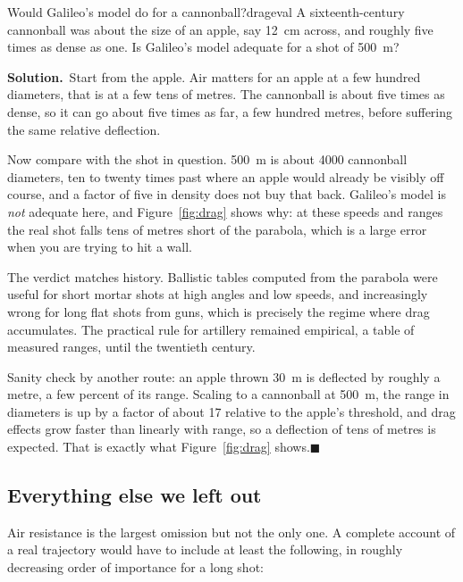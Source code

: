 \documentclass[11pt,twoside,openany]{book}
\newcounter{check}[chapter]
\newcommand{\solution}{\par\smallskip\noindent\textbf{Solution.}\ }
\newcommand{\qed}{\hfill$\blacksquare$}
\begin{document}
\begin{example}{Would Galileo's model do for a cannonball?}{drageval}
A sixteenth-century cannonball was about the size of an apple, say \SI{12}{\centi\metre} across, and roughly five times as dense as one. Is Galileo's model adequate for a shot of \SI{500}{\metre}?

\solution Start from the apple. Air matters for an apple at a few hundred diameters, that is at a few tens of metres. The cannonball is about five times as dense, so it can go about five times as far, a few hundred metres, before suffering the same relative deflection.

Now compare with the shot in question. \SI{500}{\metre} is about \num{4000} cannonball diameters, ten to twenty times past where an apple would already be visibly off course, and a factor of five in density does not buy that back. Galileo's model is \emph{not} adequate here, and Figure~\ref{fig:drag} shows why: at these speeds and ranges the real shot falls tens of metres short of the parabola, which is a large error when you are trying to hit a wall.

The verdict matches history. Ballistic tables computed from the parabola were useful for short mortar shots at high angles and low speeds, and increasingly wrong for long flat shots from guns, which is precisely the regime where drag accumulates. The practical rule for artillery remained empirical, a table of measured ranges, until the twentieth century.

Sanity check by another route: an apple thrown \SI{30}{\metre} is deflected by roughly a metre, a few percent of its range. Scaling to a cannonball at \SI{500}{\metre}, the range in diameters is up by a factor of about \num{17} relative to the apple's threshold, and drag effects grow faster than linearly with range, so a deflection of tens of metres is expected. That is exactly what Figure~\ref{fig:drag} shows.\qed
\end{example}

\subsection{Everything else we left out}

Air resistance is the largest omission but not the only one. A complete account of a real trajectory would have to include at least the following, in roughly decreasing order of importance for a long shot:
\end{document}
